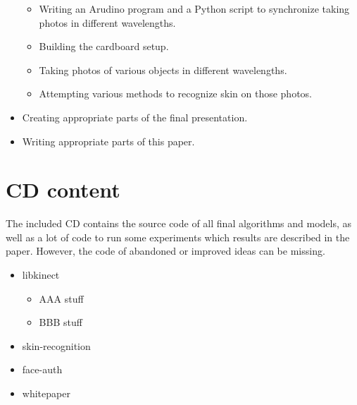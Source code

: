 \begin{itemize}
\begin{itemize}
                \item Writing an Arudino program and a Python script to synchronize
                taking photos in different wavelengths.
                \item Building the cardboard setup.
                \item Taking photos of various objects in different wavelengths.
                \item Attempting various methods to recognize skin on those photos.
            \end{itemize}
            \item Creating appropriate parts of the final presentation.
            \item Writing appropriate parts of this paper.
        \end{itemize}

\chapter{CD content}
    The included CD contains the source code of all final algorithms
    and models, as well as a lot of code to run some experiments
    which results are described in the paper.
    However, the code of abandoned or improved ideas can be missing.

    \begin{itemize}
        \item libkinect
        \begin{itemize}
            \item AAA stuff
            \item BBB stuff
        \end{itemize}
        \item skin-recognition
        \item face-auth
        \item whitepaper
    \end{itemize}
